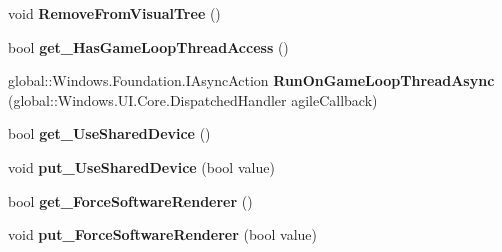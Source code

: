 \begin{DoxyCompactItemize}
void {\bfseries Remove\+From\+Visual\+Tree} ()
\item 
\mbox{\label{class_microsoft_1_1_graphics_1_1_canvas_1_1_u_i_1_1_xaml_1_1_canvas_animated_control_a2b8dde3fa5be471394533ca75407cea5}} 
bool {\bfseries get\+\_\+\+Has\+Game\+Loop\+Thread\+Access} ()
\item 
\mbox{\label{class_microsoft_1_1_graphics_1_1_canvas_1_1_u_i_1_1_xaml_1_1_canvas_animated_control_a4cfd047932cd7d4165b53982ff676126}} 
global\+::\+Windows.\+Foundation.\+I\+Async\+Action {\bfseries Run\+On\+Game\+Loop\+Thread\+Async} (global\+::\+Windows.\+U\+I.\+Core.\+Dispatched\+Handler agile\+Callback)
\item 
\mbox{\label{class_microsoft_1_1_graphics_1_1_canvas_1_1_u_i_1_1_xaml_1_1_canvas_animated_control_a4ecc9ba2b48c0c82c98292d4c56ce566}} 
bool {\bfseries get\+\_\+\+Use\+Shared\+Device} ()
\item 
\mbox{\label{class_microsoft_1_1_graphics_1_1_canvas_1_1_u_i_1_1_xaml_1_1_canvas_animated_control_a4cf16f645c5c041b2789957edfabba6f}} 
void {\bfseries put\+\_\+\+Use\+Shared\+Device} (bool value)
\item 
\mbox{\label{class_microsoft_1_1_graphics_1_1_canvas_1_1_u_i_1_1_xaml_1_1_canvas_animated_control_a7832872f65d5600713fbe9a68d782b54}} 
bool {\bfseries get\+\_\+\+Force\+Software\+Renderer} ()
\item 
\mbox{\label{class_microsoft_1_1_graphics_1_1_canvas_1_1_u_i_1_1_xaml_1_1_canvas_animated_control_ae2443c631de1a00c1e44d680363acd45}} 
void {\bfseries put\+\_\+\+Force\+Software\+Renderer} (bool value)
\item 
\mbox{\label{class_microsoft_1_1_graphics_1_1_canvas_1_1_u_i_1_1_xaml_1_1_canvas_animated_control_a17fb6529b7f97cb7eec28db12e4e438b}} 

\end{DoxyCompactItemize}
